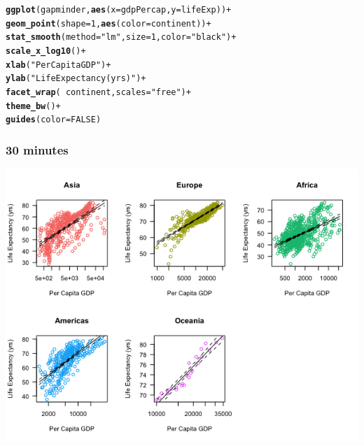 \documentclass{beamer}\usepackage[]{graphicx}\usepackage[]{color}
\makeatletter
\newcommand{\hlnum}[1]{\textcolor[rgb]{0.686,0.059,0.569}{#1}}%
\newcommand{\hlstr}[1]{\textcolor[rgb]{0.192,0.494,0.8}{#1}}%
\newcommand{\hlopt}[1]{\textcolor[rgb]{0,0,0}{#1}}%
\newcommand{\hlstd}[1]{\textcolor[rgb]{0.345,0.345,0.345}{#1}}%
\newcommand{\hlkwc}[1]{\textcolor[rgb]{0.333,0.667,0.333}{#1}}%
\newcommand{\hlkwd}[1]{\textcolor[rgb]{0.737,0.353,0.396}{\textbf{#1}}}%
\newenvironment{kframe}{%
 \def\at@end@of@kframe{}%
 \ifinner\ifhmode%
  \def\at@end@of@kframe{\end{minipage}}%
  \begin{minipage}{\columnwidth}%
 \fi\fi%
 \def\FrameCommand##1{\hskip\@totalleftmargin \hskip-\fboxsep
 \colorbox{shadecolor}{##1}\hskip-\fboxsep
     \hskip-\linewidth \hskip-\@totalleftmargin \hskip\columnwidth}%
 \MakeFramed {\advance\hsize-\width
   \@totalleftmargin\z@ \linewidth\hsize
   \@setminipage}}%
 {\par\unskip\endMakeFramed%
 \at@end@of@kframe}
\newenvironment{knitrout}{}{} %
\makeatother
\begin{document}
\begin{frame}[fragile]
\frametitle{}
\begin{knitrout}\footnotesize
{}\color{fgcolor}\begin{kframe}
\begin{alltt}
\hlkwd{ggplot}\hlstd{(gapminder,} \hlkwd{aes}\hlstd{(}\hlkwc{x} \hlstd{= gdpPercap,} \hlkwc{y} \hlstd{= lifeExp))} \hlopt{+}
  \hlkwd{geom_point}\hlstd{(}\hlkwc{shape} \hlstd{=} \hlnum{1}\hlstd{,} \hlkwd{aes}\hlstd{(}\hlkwc{color} \hlstd{= continent))} \hlopt{+}
  \hlkwd{stat_smooth}\hlstd{(}\hlkwc{method} \hlstd{=} \hlstr{"lm"}\hlstd{,} \hlkwc{size} \hlstd{=} \hlnum{1}\hlstd{,} \hlkwc{color} \hlstd{=} \hlstr{"black"}\hlstd{)} \hlopt{+}
  \hlkwd{scale_x_log10}\hlstd{()} \hlopt{+}
  \hlkwd{xlab}\hlstd{(}\hlstr{"Per Capita GDP"}\hlstd{)} \hlopt{+}
  \hlkwd{ylab}\hlstd{(}\hlstr{"Life Expectancy (yrs)"}\hlstd{)} \hlopt{+}
  \hlkwd{facet_wrap}\hlstd{(}\hlopt{~}\hlstd{continent,} \hlkwc{scales} \hlstd{=} \hlstr{"free"}\hlstd{)} \hlopt{+}
  \hlkwd{theme_bw}\hlstd{()} \hlopt{+}
  \hlkwd{guides}\hlstd{(}\hlkwc{color}\hlstd{=}\hlnum{FALSE}\hlstd{)}
\end{alltt}
\end{kframe}
\end{knitrout}
\end{frame}

\begin{frame}[fragile]
\frametitle{30 minutes}

\begin{center}
\includegraphics[scale=0.5]{images/base_continents_plot.png}
\end{center}
\end{frame}
\end{document}
